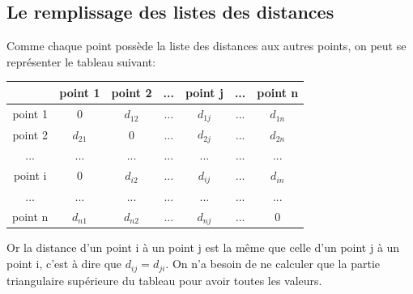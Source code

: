 \documentclass[stage2a]{tnreport}
\begin{document}
\subsection{Le remplissage des listes des distances}
Comme chaque point possède la liste des distances aux autres points, on peut se représenter le tableau suivant:\\
\hspace*{3cm}
\begin{tabular}{c|cccccc}
   & point 1 & point 2 & ... & point j & ... & point n \\
  \hline
  point 1 & 0 & \begin{math} d_{12} \end{math} & ... & \begin{math} d_{1j} \end{math} & ... & \begin{math} d_{1n} \end{math} \\
  point 2 & \begin{math} d_{21} \end{math} & 0 & ... & \begin{math} d_{2j} \end{math} & ... & \begin{math} d_{2n} \end{math}\\
  ... & ... & ... &  ...  & ... & ... & ... \\
  point i & 0 & \begin{math} d_{i2} \end{math} & ... & \begin{math} d_{ij} \end{math} & ... & \begin{math} d_{in} \end{math} \\
   ... & ... & ... & ... & ... & ... & ... \\
  point n & \begin{math} d_{n1} \end{math} & \begin{math} d_{n2} \end{math} & ... & \begin{math} d_{nj} \end{math} & ... & 0 \\
\end{tabular}

Or la distance d'un point i à un point j est la même que celle d'un point j à un point i, c'est à dire que \begin{math} d_{ij} = d_{ji}\end{math}. On n'a besoin de ne calculer que la partie triangulaire supérieure du tableau pour avoir toutes les valeurs.\\
\end{document}
